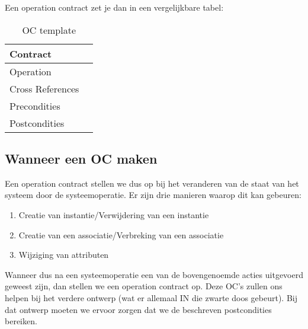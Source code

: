 Een operation contract zet je dan in een vergelijkbare tabel:

\begin{table}[htbp]
	\centering
		\begin{tabular}{|l|p{9cm}|}
			\hline
			Contract & \\
			\hline
			Operation & \\
			\hline
			Cross References & \\
			\hline
			Precondities & \\
			\hline
			Postcondities & \\
			\hline
		\end{tabular}
	\caption{OC template}
	\label{tab:OCTemplate}
\end{table}

\subsection{Wanneer een OC maken}

Een operation contract stellen we dus op bij het veranderen van de staat van het systeem door de systeemoperatie. Er zijn drie manieren waarop dit kan gebeuren:
\begin{enumerate}
	\item Creatie van instantie/Verwijdering van een instantie
	\item Creatie van een associatie/Verbreking van een associatie
	\item Wijziging van attributen
\end{enumerate}

Wanneer dus na een systeemoperatie een van de bovengenoemde acties uitgevoerd geweest zijn, dan stellen we een operation contract op. Deze OC's zullen ons helpen bij het verdere ontwerp (wat er allemaal IN die zwarte doos gebeurt). Bij dat ontwerp moeten we ervoor zorgen dat we de beschreven postcondities bereiken.






